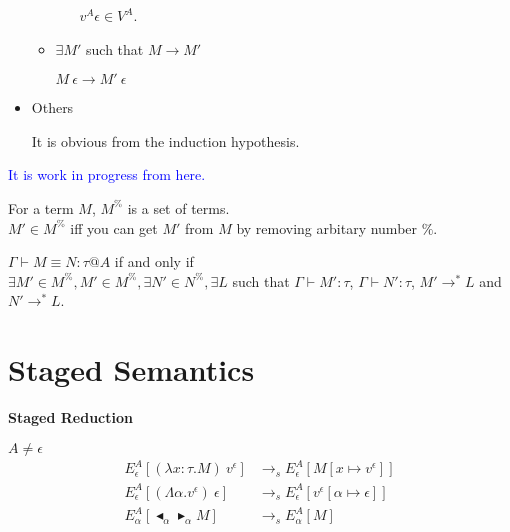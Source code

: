 \documentclass[9pt, a4paper]{extarticle}
\theoremstyle{break}
\newcommand{\figheader}[2]{
  \begin{flushleft}
    #2 {\bf \normalsize #1}
\end{flushleft}}
\newcommand{\G}{\Gamma}
\newcommand{\V}{\vdash}
\newcommand{\TB}{\blacktriangleright}
\newcommand{\TBL}{\blacktriangleleft}
\newcommand{\E}{\equiv}
\newcommand{\blue}[1]{\textcolor{blue}{ #1 }}
\begin{document}
\begin{itemize}
\begin{itemize}
\begin{itemize}
                        $v^A \epsilon \in V^A$.
                \end{itemize}
                    
            \item $\exists M'$ such that $M \longrightarrow M'$
            
                $M\ \epsilon \longrightarrow M'\ \epsilon$
        \end{itemize}

    \item Others
    
        It is obvious from the induction hypothesis.

\end{itemize}

\blue{\huge{It is work in progress from here.}}

\begin{dfn}
    For a term $M$, $M^\%$ is a set of terms.\\
    $M' \in M^\%$ iff you can get $M'$ from $M$ by removing arbitary number $\%$.
\end{dfn}

\begin{thm}
    $\G \V M \E N : \tau @A$ if and only if\\
    $\exists M' \in M^\%, M' \in M^\%, \exists N' \in N^\%, \exists L$
    such that $\G \V M' : \tau$, $\G \V N' : \tau$, $M' \longrightarrow^* L$ and $N' \longrightarrow^* L$.
\end{thm}

\section{ Staged Semantics }

\figheader{Staged Reduction}{}
$A \neq \epsilon$\\
\begin{align*}
    E^A_\epsilon [(\lambda x:\tau.M)\ v^\epsilon] & \longrightarrow_s E^A_\epsilon[M[x\mapsto v^\epsilon]] \\
    E^A_\epsilon [(\Lambda\alpha.v^\epsilon)\ \epsilon] & \longrightarrow_s E^A_\epsilon[v^\epsilon[\alpha\mapsto \epsilon]] \\
    E^A_\alpha [\TBL_\alpha \TB_\alpha M] & \longrightarrow_s E^A_\alpha[M] \\
\end{align*}
\end{document}
